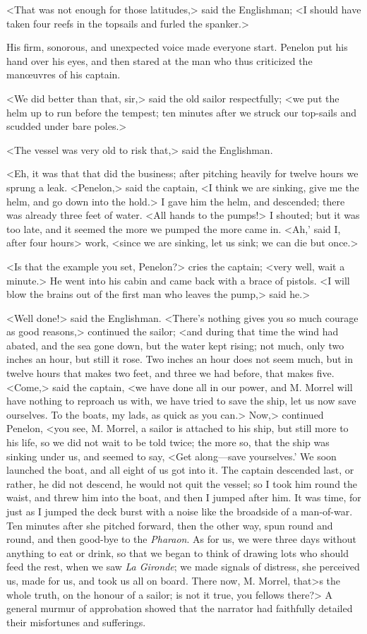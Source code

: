 <That was not enough for those latitudes,> said the Englishman; <I should have taken four reefs in the topsails and furled the spanker.> 

 His firm, sonorous, and unexpected voice made everyone start. Penelon put his hand over his eyes, and then stared at the man who thus criticized the manœuvres of his captain. 

 <We did better than that, sir,> said the old sailor respectfully; <we put the helm up to run before the tempest; ten minutes after we struck our top-sails and scudded under bare poles.> 

 <The vessel was very old to risk that,> said the Englishman. 

 <Eh, it was that that did the business; after pitching heavily for twelve hours we sprung a leak. <Penelon,> said the captain, <I think we are sinking, give me the helm, and go down into the hold.> I gave him the helm, and descended; there was already three feet of water. <All hands to the pumps!> I shouted; but it was too late, and it seemed the more we pumped the more came in. <Ah,' said I, after four hours> work, <since we are sinking, let us sink; we can die but once.>

<Is that the example you set, Penelon?> cries the captain; <very well, wait a minute.> He went into his cabin and came back with a brace of pistols. <I will blow the brains out of the first man who leaves the pump,> said he.> 

 <Well done!> said the Englishman.  <There's nothing gives you so much courage as good reasons,> continued the sailor; <and during that time the wind had abated, and the sea gone down, but the water kept rising; not much, only two inches an hour, but still it rose. Two inches an hour does not seem much, but in twelve hours that makes two feet, and three we had before, that makes five. <Come,> said the captain, <we have done all in our power, and M. Morrel will have nothing to reproach us with, we have tried to save the ship, let us now save ourselves. To the boats, my lads, as quick as you can.> Now,> continued Penelon, <you see, M. Morrel, a sailor is attached to his ship, but still more to his life, so we did not wait to be told twice; the more so, that the ship was sinking under us, and seemed to say, <Get along—save yourselves.' We soon launched the boat, and all eight of us got into it. The captain descended last, or rather, he did not descend, he would not quit the vessel; so I took him round the waist, and threw him into the boat, and then I jumped after him. It was time, for just as I jumped the deck burst with a noise like the broadside of a man-of-war. Ten minutes after she pitched forward, then the other way, spun round and round, and then good-bye to the \textit{Pharaon}. As for us, we were three days without anything to eat or drink, so that we began to think of drawing lots who should feed the rest, when we saw \textit{La Gironde}; we made signals of distress, she perceived us, made for us, and took us all on board. There now, M. Morrel, that>s the whole truth, on the honour of a sailor; is not it true, you fellows there?> A general murmur of approbation showed that the narrator had faithfully detailed their misfortunes and sufferings. 

